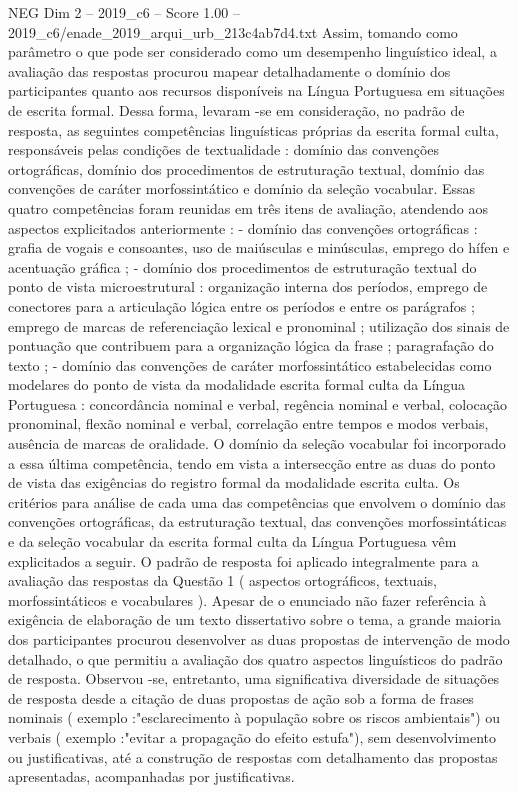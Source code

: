 \begin{textsample}{NEG Dim 2 – 2019\_c6 – Score 1.00 – 2019\_c6/enade\_2019\_arqui\_urb\_213c4ab7d4.txt}
Assim, tomando como parâmetro o que pode ser considerado como um desempenho linguístico ideal, a avaliação das respostas procurou mapear detalhadamente o domínio dos participantes quanto aos recursos disponíveis na Língua Portuguesa em situações de escrita formal.
Dessa forma, levaram -se em consideração, no padrão de resposta, as seguintes competências linguísticas próprias da escrita formal culta, responsáveis pelas condições de textualidade : domínio das convenções ortográficas, domínio dos procedimentos de estruturação textual, domínio das convenções de caráter morfossintático e domínio da seleção vocabular.
Essas quatro competências foram reunidas em três itens de avaliação, atendendo aos aspectos explicitados anteriormente : - domínio das convenções ortográficas : grafia de vogais e consoantes, uso de maiúsculas e minúsculas, emprego do hífen e acentuação gráfica ; - domínio dos procedimentos de estruturação textual do ponto de vista microestrutural : organização interna dos períodos, emprego de conectores para a articulação lógica entre os períodos e entre os parágrafos ; emprego de marcas de referenciação lexical e pronominal ; utilização dos sinais de pontuação que contribuem para a organização lógica da frase ; paragrafação do texto ; - domínio das convenções de caráter morfossintático estabelecidas como modelares do ponto de vista da modalidade escrita formal culta da Língua Portuguesa : concordância nominal e verbal, regência nominal e verbal, colocação pronominal, flexão nominal e verbal, correlação entre tempos e modos verbais, ausência de marcas de oralidade.
O domínio da seleção vocabular foi incorporado a essa última competência, tendo em vista a intersecção entre as duas do ponto de vista das exigências do registro formal da modalidade escrita culta.
Os critérios para análise de cada uma das competências que envolvem o domínio das convenções ortográficas, da estruturação textual, das convenções morfossintáticas e da seleção vocabular da escrita formal culta da Língua Portuguesa vêm explicitados a seguir.
O padrão de resposta foi aplicado integralmente para a avaliação das respostas da Questão 1 ( aspectos ortográficos, textuais, morfossintáticos e vocabulares ).
Apesar de o enunciado não fazer referência à exigência de elaboração de um texto dissertativo sobre o tema, a grande maioria dos participantes procurou desenvolver as duas propostas de intervenção de modo detalhado, o que permitiu a avaliação dos quatro aspectos linguísticos do padrão de resposta.
Observou -se, entretanto, uma significativa diversidade de situações de resposta desde a citação de duas propostas de ação sob a forma de frases nominais ( exemplo :"esclarecimento à população sobre os riscos ambientais") ou verbais ( exemplo :"evitar a propagação do efeito estufa"), sem desenvolvimento ou justificativas, até a construção de respostas com detalhamento das propostas apresentadas, acompanhadas por justificativas.

\end{textsample}
